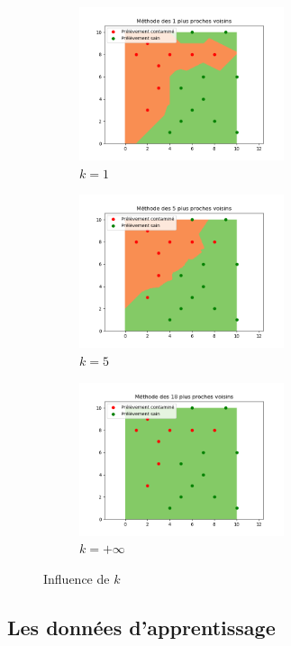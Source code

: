 \documentclass[12pt]{article}                   %
\theoremstyle{exercicestyle}
\theoremstyle{break2}
\theoremstyle{break3}
\begin{document}
\begin{figure}[!h]
    \begin{subfigure}[b]{5cm}
\begin{center}
\includegraphics[width=6cm]{1NN.png}
\caption{$k = 1$}
\end{center}
    \end{subfigure}
    \begin{subfigure}[b]{5cm}
\begin{center}
\includegraphics[width=6cm]{5NN.png}
\caption{$k = 5$}
\end{center}
    \end{subfigure}
    \begin{subfigure}[b]{5cm}
\begin{center}
\includegraphics[width=6cm]{18NN.png}
\caption{$k = +\infty $}
\end{center}
    \end{subfigure}
    \caption{Influence de $k$}
\label{fig:kinfl}
\end{figure}


\subsection{Les données d'apprentissage}
\end{document}
